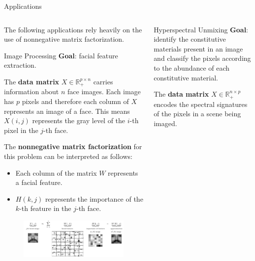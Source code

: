 \documentclass[final]{beamer}
\newlength{\onecolwid}
\newlength{\threecolwid}
\newcommand{\real}{\mathbb{R}}
\begin{document}
\begin{frame}
\begin{columns}[t]
\begin{column}{\threecolwid}
\begin{exampleblock}{Applications}
\vspace{-0.8cm}
\begin{columns}[t]
\begin{column}{\onecolwid}

The following applications rely heavily on the use of nonnegative matrix factorization.

\begin{block}{Image Processing}
\textbf{Goal}: facial feature extraction.

The \textbf{data matrix} $X\in\real^{p\times n}_+$ carries information about $n$ face images. Each image has $p$ pixels and therefore each column of $X$ represents an image of a face.
This means $X(i, j)$ represents the gray level of the $i$-th pixel in the $j$-th face.

The \textbf{nonnegative matrix factorization} for this problem can be interpreted as follows:
\begin{itemize}
    \item Each column of the matrix $W$ represents a facial feature.
    \item $H(k, j)$ represents the importance of the $k$-th feature in the $j$-th face.
\end{itemize}
\begin{figure}
    \centering
    \includegraphics{../images/NMF_app1.png}
\end{figure}
\end{block}
\end{column}
\begin{column}{\onecolwid}

\begin{block}{Hyperspectral Unmixing}
\textbf{Goal}: identify the constitutive materials present in an image and classify the pixels according to the abundance of each constitutive material.

The \textbf{data matrix} $X\in\real^{n\times p}_+$ encodes the spectral signatures of the pixels in a scene being imaged.


\end{block}
\end{column}
\end{columns}
\end{exampleblock}
\end{column}
\end{columns}
\end{frame}
\end{document}
